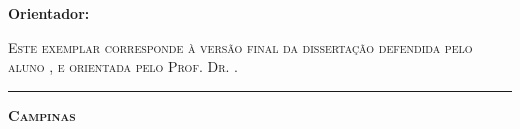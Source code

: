 \noindent
\textbf{Orientador: \orientador}
\vspace{1cm}

\noindent
\begin{minipage}[c]{.5\textwidth}
  {\footnotesize\textsc{Este exemplar corresponde à versão final da dissertação
  defendida pelo aluno \autor, e orientada pelo Prof. Dr. \orientador.
  }}
\end{minipage}
\vspace{1cm}

\noindent
{
\vspace{.5cm}
\noindent
\rule[1pt]{7cm}{.5pt}  %
}
\vspace{.5cm}









\begin{center}
  {\small\textbf{\textsc{ Campinas \\ \ano}}}
\end{center}

